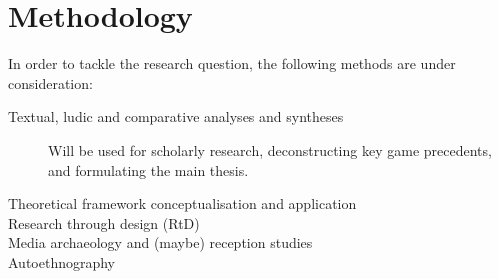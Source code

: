 \documentclass[12pt]{article}
\begin{document}
\section{Methodology}     
    \par {}
In order to tackle the research question, the following methods are under consideration:
\begin{description}
    \item[Textual, ludic and comparative analyses and syntheses]
        Will be used for scholarly research, deconstructing key game precedents, and formulating the main thesis.
    \item[Theoretical framework conceptualisation and application]
    \item[Research through design (RtD)]
    \item[Media archaeology and (maybe) reception studies]
    \item[Autoethnography]
\end{description}
\newpage
\end{document}
